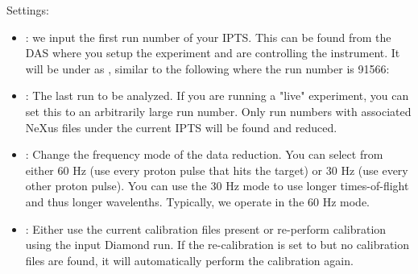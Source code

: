 Settings:
\begin{itemize}

\item {}: we input the first run number of your IPTS. This can be found from the DAS where you setup the experiment and are controlling the instrument. It will be under  as , similar to the following where the run number is 91566:

  \noindent{}
  
\item {}: The last run to be analyzed. If you are running a "live" experiment, you can set this to an arbitrarily large run number. Only run numbers with associated NeXus files under the current IPTS will be found and reduced. 

\item {}: Change the frequency mode of the data reduction. You can select from either 60 Hz (use every proton pulse that hits the target) or 30 Hz (use every other proton pulse). You can use the 30 Hz mode to use longer times-of-flight and thus longer wavelenths. Typically, we operate in the 60 Hz mode. 

\item {}: Either use the current calibration files present or re-perform calibration using the input Diamond run. If the re-calibration is set to  but no calibration files are found, it will automatically perform the calibration again. 


\end{itemize}
